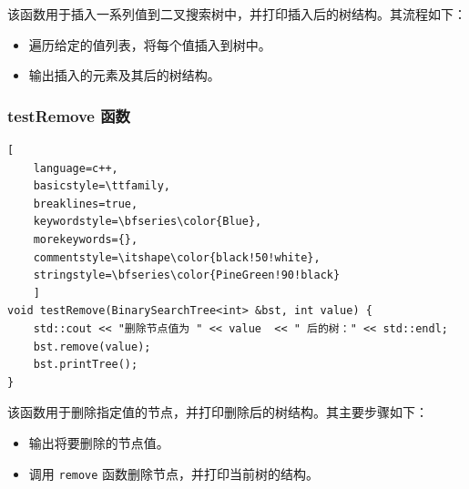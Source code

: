 \documentclass[UTF8]{ctexart}
\begin{document}
该函数用于插入一系列值到二叉搜索树中，并打印插入后的树结构。其流程如下：
\begin{itemize}
    \item 遍历给定的值列表，将每个值插入到树中。
    \item 输出插入的元素及其后的树结构。
\end{itemize}

\subsubsection{testRemove 函数}
\begin{lstlisting}[ 
    language=c++,
    basicstyle=\ttfamily,
    breaklines=true,
    keywordstyle=\bfseries\color{Blue}, 
    morekeywords={}, 
    commentstyle=\itshape\color{black!50!white},
    stringstyle=\bfseries\color{PineGreen!90!black} 
    ]
void testRemove(BinarySearchTree<int> &bst, int value) {
    std::cout << "删除节点值为 " << value  << " 后的树：" << std::endl;
    bst.remove(value);
    bst.printTree();
}
\end{lstlisting}

该函数用于删除指定值的节点，并打印删除后的树结构。其主要步骤如下：

\begin{itemize}
    \item 输出将要删除的节点值。
    \item 调用 \texttt{remove} 函数删除节点，并打印当前树的结构。
\end{itemize}
\end{document}
